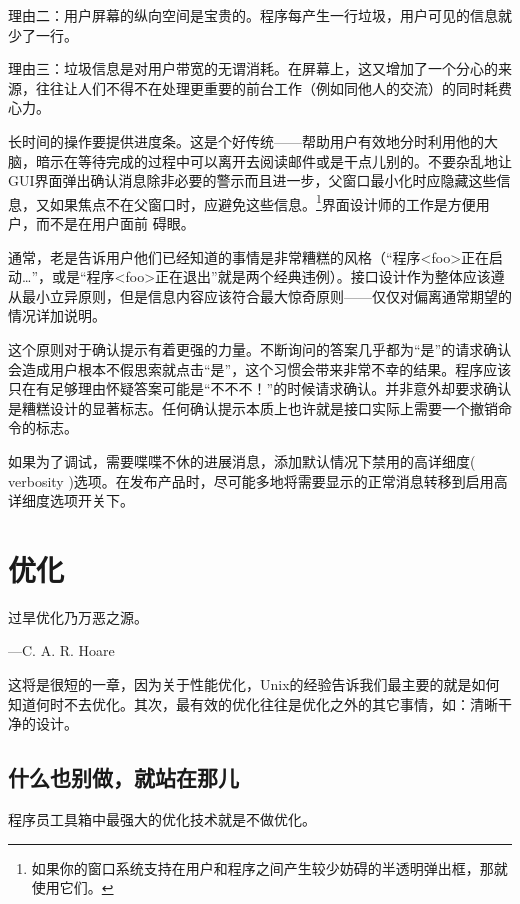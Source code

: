 \documentclass[12pt,oneside]{book}
\begin{document}
\begin{common-format}
理由二：用户屏幕的纵向空间是宝贵的。程序每产生一行垃圾，用户可见的信息就少了一行。

理由三：垃圾信息是对用户带宽的无谓消耗。在屏幕上，这又增加了一个分心的来源，往往让人们不得不在处理更重要的前台工作（例如同他人的交流）的同时耗费心力。

长时间的操作要提供进度条。这是个好传统——帮助用户有效地分时利用他的大脑，暗示在等待完成的过程中可以离开去阅读邮件或是干点儿别的。不要杂乱地让GUI界面弹出确认消息除非必要的警示而且进一步，父窗口最小化时应隐藏这些信息，又如果焦点不在父窗口时，应避免这些信息。\footnote{如果你的窗口系统支持在用户和程序之间产生较少妨碍的半透明弹出框，那就使用它们。}界面设计师的工作是方便用户，而不是在用户面前
碍眼。

通常，老是告诉用户他们已经知道的事情是非常糟糕的风格（“程序<foo>正在启动…”，或是“程序<foo>正在退出”就是两个经典违例）。接口设计作为整体应该遵从最小立异原则，但是信息内容应该符合最大惊奇原则——仅仅对偏离通常期望的情况详加说明。

这个原则对于确认提示有着更强的力量。不断询问的答案几乎都为“是”的请求确认会造成用户根本不假思索就点击“是”，这个习惯会带来非常不幸的结果。程序应该只在有足够理由怀疑答案可能是“不不不！”的时候请求确认。并非意外却要求确认是糟糕设计的显著标志。任何确认提示本质上也许就是接口实际上需要一个撤销命令的标志。

如果为了调试，需要喋喋不休的进展消息，添加默认情况下禁用的高详细度( verbosity )选项。在发布产品时，尽可能多地将需要显示的正常消息转移到启用高详细度选项开关下。



\chapter{优化}
\begin{flushright}
\begin{notecard}{15em}
过旱优化乃万恶之源。

{\hfill —C. A. R. Hoare}
\end{notecard}
\end{flushright}
    
这将是很短的一章，因为关于性能优化，Unix的经验告诉我们最主要的就是如何知道何时不去优化。其次，最有效的优化往往是优化之外的其它事情，如：清晰干净的设计。

\section{什么也别做，就站在那儿}
程序员工具箱中最强大的优化技术就是不做优化。


\end{common-format}
\end{document}
